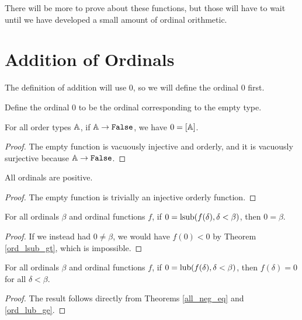 \documentclass[../../math.tex]{subfiles}
\begin{document}
There will be more to prove about these functions, but those will have to wait
until we have developed a small amount of ordinal orithmetic.

\section{Addition of Ordinals}

The definition of addition will use $0$, so we will define the ordinal $0$
first.

\begin{instance}
    Define the ordinal $0$ to be the ordinal corresponding to the empty type.
\end{instance}

\begin{theorem} \label{ord_false_0}
    For all order types $\mathbb{A}$, if $\A \to \False$, we have $0 = [\mathbb{A}]$.
\end{theorem}
\begin{proof}
    The empty function is vacuously injective and orderly, and it is vacuously
    surjective because $\A \to \False$.
\end{proof}

\begin{instance}
    All ordinals are positive.
\end{instance}
\begin{proof}
    The empty function is trivially an injective orderly function.
\end{proof}

\begin{theorem} \label{ord_lsub_f_zero}
    For all ordinals $\beta$ and ordinal functions $f$, if $0 = \operatorname{lsub}(f(\delta),
    \delta < \beta)$, then $0 = \beta$.
\end{theorem}
\begin{proof}
    If we instead had $0 \neq \beta$, we would have $f(0) < 0$ by Theorem
    \ref{ord_lsub_gt}, which is impossible.
\end{proof}

\begin{theorem} \label{ord_lub_f_zero}
    For all ordinals $\beta$ and ordinal functions $f$, if $0 = \operatorname{lub}(f(\delta),
    \delta < \beta)$, then $f(\delta) = 0$ for all $\delta < \beta$.
\end{theorem}
\begin{proof}
    The result follows directly from Theorems \ref{all_neg_eq} and
    \ref{ord_lub_ge}.
\end{proof}
\end{document}
